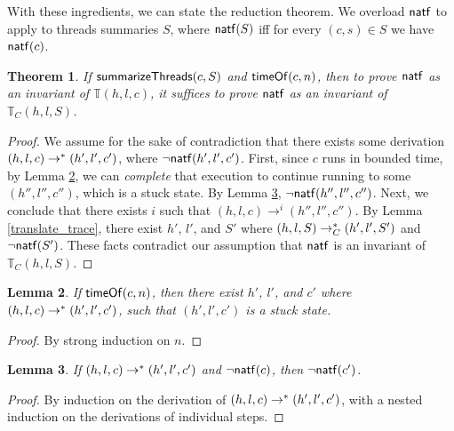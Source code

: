 \documentclass{amsbook}
\newtheorem{theorem}{Theorem}[chapter]
\newtheorem{lemma}[theorem]{Lemma}
\theoremstyle{definition}
\theoremstyle{remark}
\numberwithin{section}{chapter}
\numberwithin{equation}{chapter}
\begin{document}
With these ingredients, we can state the reduction theorem.
We overload $\mathsf{natf}$ to apply to threads summaries $S$, where $\mathsf{natf}(S)$ iff for every $(c, s) \in S$ we have $\mathsf{natf}(c)$.
\abstraction
\begin{theorem}
  If $\mathsf{summarizeThreads}(c, S)$ and $\mathsf{timeOf}(c, n)$, then to prove $\mathsf{natf}$ as an invariant of $\mathbb T(h, l, c)$, it suffices to prove $\mathsf{natf}$ as an invariant of $\mathbb T_C(h, l, S)$.
\end{theorem}
\begin{proof}
  We assume for the sake of contradiction that there exists some derivation $(h, l, c) \to^* (h', l', c')$, where $\neg \mathsf{natf}(h', l', c')$.
  First, since $c$ runs in bounded time, by Lemma \ref{completion}, we can \emph{complete} that execution to continue running to some $(h'', l'', c'')$, which is a stuck state.
  By Lemma \ref{stillFailing}, $\neg \mathsf{natf}(h'', l'', c'')$.
  Next, we conclude that there exists $i$ such that $(h, l, c) \to^i (h'', l'', c'')$.
  By Lemma \ref{translate_trace}, there exist $h'$, $l'$, and $S'$ where $(h, l, S) \to_C^* (h', l', S')$ and $\neg \mathsf{natf}(S')$.
  These facts contradict our assumption that $\mathsf{natf}$ is an invariant of $\mathbb T_C(h, l, S)$.
\end{proof}

\begin{lemma}\label{completion}
  If $\mathsf{timeOf}(c, n)$, then there exist $h'$, $l'$, and $c'$ where $(h, l, c) \to^* (h', l', c')$, such that $(h', l', c')$ is a stuck state.
\end{lemma}
\begin{proof}
  By strong induction on $n$.
\end{proof}

\begin{lemma}\label{stillFailing}
  If $(h, l, c) \to^* (h', l', c')$ and $\neg \mathsf{natf}(c)$, then $\neg \mathsf{natf}(c')$.
\end{lemma}
\begin{proof}
  By induction on the derivation of $(h, l, c) \to^* (h', l', c')$, with a nested induction on the derivations of individual steps.
\end{proof}
\end{document}
